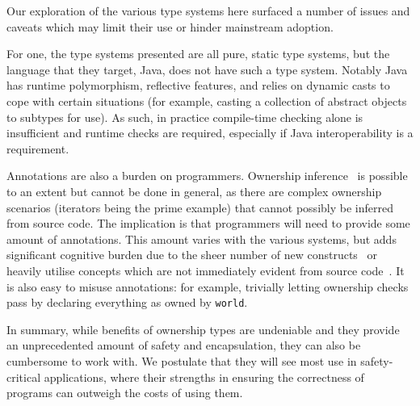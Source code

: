 \documentclass{acm_proc_article-sp}
\begin{document}
Our exploration of the various type systems here surfaced a number of issues and
caveats which may limit their use or hinder mainstream adoption.

For one, the type systems presented are all pure, static type systems, but the
language that they target, Java, does not have such a type system. Notably Java
has runtime polymorphism, reflective features, and relies on dynamic casts to
cope with certain situations (for example, casting a collection of abstract
objects to subtypes for use). As such, in practice compile-time checking alone
is insufficient \cite{boyapati04safejava} and runtime checks are required,
especially if Java interoperability is a requirement.

Annotations are also a burden on programmers. Ownership
inference~\cite{boyapati04safejava} is possible to an extent but cannot be done
in general, as there are complex ownership scenarios (iterators being the prime
example) that cannot possibly be inferred from source code. The implication is
that programmers will need to provide some amount of annotations. This amount
varies with the various systems, but adds significant cognitive burden due to
the sheer number of new constructs~\cite{boyapati04safejava} or heavily utilise
concepts which are not immediately evident from source
code~\cite{cameron07mojo}. It is also easy to misuse annotations: for example,
trivially letting ownership checks pass by declaring everything as owned by
\lstinline|world|.

In summary, while benefits of ownership types are undeniable and they provide
an unprecedented amount of safety and encapsulation, they can also be cumbersome
to work with. We postulate that they will see most use in safety-critical
applications, where their strengths in ensuring the correctness of programs can
outweigh the costs of using them.
\end{document}
